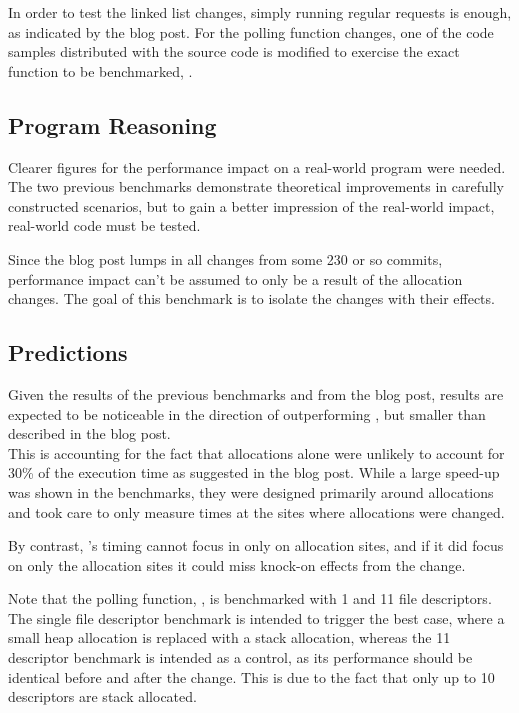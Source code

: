 In order to test the linked list changes, simply running regular  requests is enough, as indicated by the blog post. For the polling function changes, one of the code samples distributed with the  source code is modified to exercise the exact function to be benchmarked, .

\subsection{Program Reasoning}

Clearer figures for the performance impact on a real-world program were needed. The two previous benchmarks demonstrate theoretical improvements in carefully constructed scenarios, but to gain a better impression of the real-world impact, real-world code must be tested.

Since the blog post lumps in all changes from some 230 or so commits, performance impact can't be assumed to only be a result of the allocation changes. The goal of this benchmark is to isolate the changes with their effects.

\subsection{Predictions}

Given the results of the previous benchmarks and from the blog post, results are expected to be noticeable in the direction of outperforming \malloc{}, but smaller than described in the blog post.\\
This is accounting for the fact that allocations alone were unlikely to account for 30\% of the execution time as suggested in the blog post. While a large speed-up was shown in the benchmarks, they were designed primarily around allocations and took care to only measure times at the sites where allocations were changed.

By contrast, 's timing cannot focus in only on allocation sites, and if it did focus on only the allocation sites it could miss knock-on effects from the change.

Note that the polling function, , is benchmarked with 1 and 11 file descriptors. The single file descriptor benchmark is intended to trigger the best case, where a small heap allocation is replaced with a stack allocation, whereas the 11 descriptor benchmark is intended as a control, as its performance should be identical before and after the change. This is due to the fact that only up to 10 descriptors are stack allocated.

